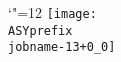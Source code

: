\setlength{\unitlength}{1pt}
\makeatletter%
\let\ASYencoding\f@encoding%
\let\ASYfamily\f@family%
\let\ASYseries\f@series%
\let\ASYshape\f@shape%
\makeatother%
{\catcode`"=12%
\texttt{[image: \\ASYprefix\\jobname-13+0\_0]}%
}%
